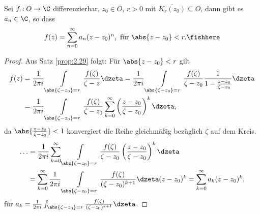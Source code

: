\begin{prop}[Potenzreihenentwicklungssatz]
\label{prop:2.30}
Sei $f:O\to\C$ differenzierbar, $z_0\in O$, $r > 0$ mit
$\overline{K_r(z_0)}\subseteq O$, dann gibt es $a_n\in\C$, so dass
\begin{align*}
f(z) = \sum\limits_{n=0}^\infty a_n(z-z_0)^n, \text{ für } \abs{z-z_0} <
r.\fishhere
\end{align*}
\end{prop}
\begin{proof}
Aus Satz \ref{prop:2.29} folgt: Für $\abs{z-z_0} < r$ gilt
\begin{align*}
f(z) &= \frac{1}{2\pi i}\int\limits_{\abs{\zeta-z_0}=r}
\frac{f(\zeta)}{\zeta-z}\dzeta = \frac{1}{2\pi i}\int\limits_{\abs{\zeta-z_0}=r}
\frac{f(\zeta)}{\zeta-z_0} \frac{1}{1-\frac{z-z_0}{\zeta-z_0}} \dzeta
\\ &= \frac{1}{2\pi i}\int\limits_{\abs{\zeta-z_0}=r} \frac{f(\zeta)}{\zeta-z_0}
\sum\limits_{k=0}^\infty \left(\frac{z-z_0}{\zeta-z_0}\right)^k \dzeta,
\end{align*}
da $\abs{\frac{z-z_0}{\zeta-z_0}}<1$ konvergiert die Reihe gleichmäßig bezüglich $\zeta$
auf dem Kreis.
\begin{align*}
\ldots &= \frac{1}{2\pi i}\sum\limits_{k=0}^\infty \int\limits_{\abs{\zeta-z_0}=r}
\frac{f(\zeta)}{\zeta-z_0}\left(\frac{z-z_0}{\zeta-z_0}\right)^k \dzeta
\\ &= \sum\limits_{k=0}^\infty \frac{1}{2\pi i} \int\limits_{\abs{\zeta-z_0}=r}
\frac{f(\zeta)}{(\zeta-z_0)^{k+1}}\dzeta (z-z_0)^k
= \sum\limits_{k=0}^\infty a_k (z-z_0)^k,
\end{align*}
für $a_k = \frac{1}{2\pi i} \int_{\abs{\zeta-z_0}=r}
\frac{f(\zeta)}{(\zeta-z_0)^{k+1}}\dzeta$.\qedhere
\end{proof}

